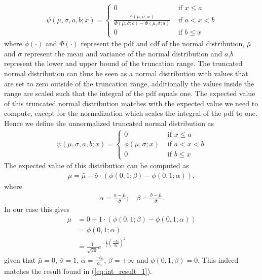 \documentclass[12pt]{article}
\theoremstyle{remark}
\begin{document}
\begin{align}
	\psi(\bar{\mu}, \bar{\sigma}, a, b ; x)= \begin{cases}0 & \text { if } x \leq a \\  \frac{\phi(\bar{\mu}, \bar{\sigma} ; x)}{\Phi(\bar{\mu}, \bar{\sigma} ; b) - \Phi(\bar{\mu}, \bar{\sigma} ; a)} & \text { if } a<x<b \\0 & \text { if } b \leq x\end{cases}
\end{align}
where $\phi(\cdot)$ and $\Phi(\cdot)$ represent the pdf and cdf of the normal distribution, $\bar{\mu}$ and $\bar{\sigma}$ represent the mean and variance of the normal distribution and $a$,$b$ represent the lower and upper bound of the truncation range. The truncated normal distribution can thus be seen as a normal distribution with values that are set to zero outside of the truncation range, additionally the values inside the range are scaled such that the integral of the pdf equals one.
The expected value of this truncated normal distribution matches with the expected value we need to compute, except for the normalization which scales the integral of the pdf to one. Hence we define the unnormalized truncated normal distribution as 
\begin{align}
	\psi(\bar{\mu}, \bar{\sigma}, a, b ; x)= \begin{cases}0 & \text { if } x \leq a \\  \phi(\bar{\mu}, \bar{\sigma} ; x) & \text { if } a<x<b \\0 & \text { if } b \leq x\end{cases}
\end{align}
The expected value of this distribution can be computed as 
\begin{align}
	\mu = \bar{\mu} - \bar{\sigma} \cdot \left(\phi(0, 1; \beta) - \phi(0, 1; \alpha)\right),
\end{align}
where 
\begin{align}
	\alpha=\frac{a-\bar{\mu}}{\bar{\sigma}} ; \quad \beta=\frac{b-\bar{\mu}}{\bar{\sigma}}.
\end{align}
In our case this gives 
\begin{align}
	\mu &= 0 - 1 \cdot \left(\phi(0, 1; \beta) - \phi(0, 1; \alpha)\right)\\
	&=  \phi(0, 1; \alpha)\\
	&= \frac{1}{\sqrt{2\pi}} e^{-\frac{1}{2} \left(\frac{-b_0}{a_0}\right)^2}
\end{align}
given that $\bar{\mu}=0$, $\bar{\sigma}=1$, $\alpha=\frac{-b_0}{a_0}$, $\beta=+\infty$ and $\phi(0, 1; \beta)=0$. This indeed matches the result found in (\ref{eq:int_result_1}).
\end{document}
